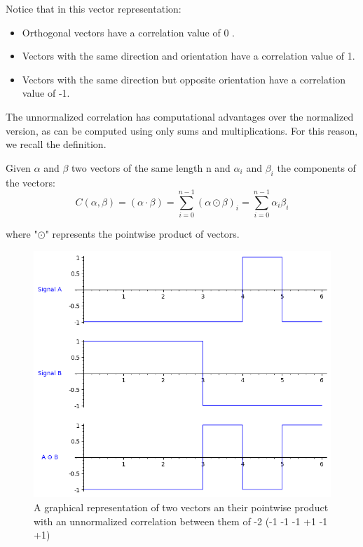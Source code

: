 Notice that in this vector
representation:
\begin{itemize}
  \item Orthogonal vectors have a correlation value of 0 .
  \item Vectors with the same direction and orientation have a correlation
  value of 1.
  \item Vectors with the same direction but opposite orientation have a
  correlation value of -1.
\end{itemize}


The unnormalized correlation has computational advantages over the normalized version, as can be computed using only sums and multiplications. For this reason, we recall the definition.

\begin{definition}\label{def:2}
  Given $\alpha$ and $\beta$ two vectors of the same length n and $\alpha_{i}$
  and $\beta_{i}$ the components of the vectors:
  \begin{equation}\label{eq:2}
    C(\alpha , \beta) = (\alpha \cdot  \beta) = \sum_{i=0}^{n-1}(\alpha \odot \beta)_{i}= \sum_{i=0}^{n-1} \alpha_{i}\beta_{i}
  \end{equation}

  where "$\odot$" represents the pointwise product of vectors.

\end{definition}


\begin{figure}[ht!] %
\begin{center}
\includegraphics[width=0.7\linewidth]{Chapters/Introduction/signals_correlation}
\end{center}
\caption{A graphical representation of two vectors an their pointwise product
with an unnormalized correlation between them of -2 (-1 -1 -1 +1 -1 +1)}
\label{introduction_signals_hadamard}
\end{figure}

